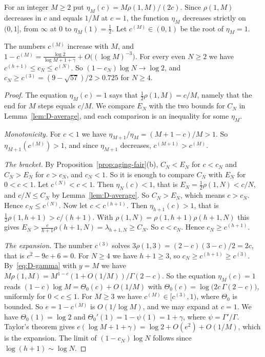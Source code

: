 For an integer $M\ge2$ put $\eta_M(c)=M\rho(1,M)/(2c)$. Since $\rho(1,M)$
decreases in $c$ and equals $1/M$ at $c=1$, the function $\eta_M$ decreases
strictly on $(0,1]$, from $\infty$ at $0$ to $\eta_M(1)=\frac12$. Let
$c^{(M)}\in(0,1)$ be the root of $\eta_M=1$.

\begin{proposition}[bracket]\label{prop:D-bracket}
The numbers $c^{(M)}$ increase with $M$, and
$1-c^{(M)}=\frac{\log2}{\log M+1+\gamma}+O\bigl((\log M)^{-3}\bigr)$. For
every even $N\ge2$ we have $c^{(h+1)}\le c_N\le c^{(N)}$. So
$(1-c_N)\log N\to\log2$, and $c_N\ge c^{(3)}=(9-\sqrt{57})/2>0.725$ for
$N\ge4$.
\end{proposition}

\begin{proof}
The equation $\eta_M(c)=1$ says that $\frac12\rho(1,M)=c/M$, namely that the
end for $M$ steps equals $c/M$. We compare $E_N$ with the two bounds for $C_N$
in Lemma~\ref{lem:D-average}, and each comparison is an inequality for some
$\eta_M$.

\emph{Monotonicity.} For $c<1$ we have $\eta_{M+1}/\eta_M=(M+1-c)/M>1$. So
$\eta_{M+1}(c^{(M)})>1$, and since $\eta_{M+1}$ decreases, $c^{(M+1)}>c^{(M)}$.

\emph{The bracket.} By Proposition~\ref{prop:aging-fair}(b), $C_N<E_N$ for
$c<c_N$ and $C_N>E_N$ for $c>c_N$, and $c_N<1$. So it is enough to compare
$C_N$ with $E_N$ for $0<c<1$. Let $c^{(N)}<c<1$. Then $\eta_N(c)<1$, that is
$E_N=\frac12\rho(1,N)<c/N$, and $c/N\le C_N$ by Lemma~\ref{lem:D-average}. So
$C_N>E_N$, which means $c>c_N$. Hence $c_N\le c^{(N)}$. Now let
$c<c^{(h+1)}$. Then $\eta_{h+1}(c)>1$, that is
$\frac12\rho(1,h+1)>c/(h+1)$. With $\rho(1,N)=\rho(1,h+1)\rho(h+1,N)$ this
gives $E_N>\frac{c}{h+1}\rho(h+1,N)=\lambda_{h+1,N}\ge C_N$. So $c<c_N$.
Hence $c_N\ge c^{(h+1)}$.

\emph{The expansion.} The number $c^{(3)}$ solves
$3\rho(1,3)=(2-c)(3-c)/2=2c$, that is $c^2-9c+6=0$. For $N\ge4$ we have
$h+1\ge3$, so $c_N\ge c^{(h+1)}\ge c^{(3)}$. By~\eqref{eq:D-gamma} with $y=M$
we have $M\rho(1,M)=M^{1-c}(1+O(1/M))/\Gamma(2-c)$. So the equation
$\eta_M(c)=1$ reads $(1-c)\log M=\Theta_0(c)+O(1/M)$ with
$\Theta_0(c)=\log\bigl(2c\,\Gamma(2-c)\bigr)$, uniformly for $0<c\le1$. For
$M\ge3$ we have $c^{(M)}\in[c^{(3)},1)$, where $\Theta_0$ is bounded. So
$e=1-c^{(M)}$ is $O(1/\log M)$, and we may expand at $c=1$. We have
$\Theta_0(1)=\log2$ and $\Theta_0'(1)=1-\psi(1)=1+\gamma$, where
$\psi=\Gamma'/\Gamma$. Taylor's theorem gives
$e(\log M+1+\gamma)=\log2+O(e^2)+O(1/M)$, which is the expansion. The limit
of $(1-c_N)\log N$ follows since $\log(h+1)\sim\log N$.
\end{proof}

